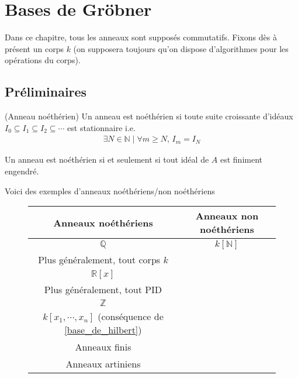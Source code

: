 \chapter{Bases de Gröbner}
    Dans ce chapitre, tous les anneaux sont supposés commutatifs. Fixons dès à présent un corps $k$ (on supposera toujours qu'on dispose d'algorithmes pour les opérations du corps). 
    \section{Préliminaires}
        \begin{defi} (Anneau noéthérien)
            Un anneau est noéthérien si toute suite croissante d'idéaux $I_0 \subseteq I_1 \subseteq I_2 \subseteq \cdots$ est stationnaire i.e. 
            \begin{align*}
                \exists N \in \mathbb{N} \mid \forall m \geq N,\, I_m = I_N 
            \end{align*}
        \end{defi}
        \begin{prop}
            Un anneau est noéthérien si et seulement si tout idéal de $A$ est finiment engendré. 
        \end{prop}
        \begin{expl}
            Voici des exemples d'anneaux noéthériens/non noéthériens
            \begin{figure}[H]
                \centering
                \begin{tabular}{c|c}
                    Anneaux noéthériens & Anneaux non noéthériens \\
                    \hline
                    $\mathbb{Q}$ & $k[\mathbb{N}]$ \\
                    Plus généralement, tout corps $k$ & \\
                    $\mathbb{R}[x]$ & \\
                    Plus généralement, tout PID & \\
                    $\mathbb{Z}$ & \\
                    $k[x_1, \cdots, x_n]$ (conséquence de \ref{base_de_hilbert}) & \\
                    Anneaux finis & \\
                    Anneaux artiniens & \\
                \end{tabular}
            \end{figure}
        \end{expl}
